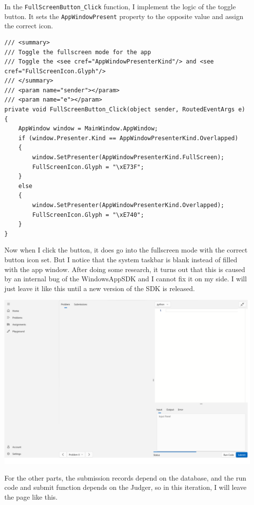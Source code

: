 \documentclass[a4paper]{report}
\begin{document}
In the \verb|FullScreenButton_Click| function, I implement the logic of the toggle button. It sets the \verb|AppWindowPresent| property\cite{microsoft:docs:windowing-overview} to the opposite value and assign the correct icon\cite{microsoft:docs:segoe-fluent-icons-font}.

\begin{verbatim}
/// <summary>
/// Toggle the fullscreen mode for the app
/// Toggle the <see cref="AppWindowPresenterKind"/> and <see cref="FullScreenIcon.Glyph"/>
/// </summary>
/// <param name="sender"></param>
/// <param name="e"></param>
private void FullScreenButton_Click(object sender, RoutedEventArgs e)
{
    AppWindow window = MainWindow.AppWindow;
    if (window.Presenter.Kind == AppWindowPresenterKind.Overlapped)
    {
        window.SetPresenter(AppWindowPresenterKind.FullScreen);
        FullScreenIcon.Glyph = "\xE73F";
    }
    else
    {
        window.SetPresenter(AppWindowPresenterKind.Overlapped);
        FullScreenIcon.Glyph = "\xE740";
    }
}
\end{verbatim}

Now when I click the button, it does go into the fullscreen mode with the correct button icon set. But I notice that the system taskbar is blank instead of filled with the app window. After doing some research, it turns out that this is caused by an internal bug of the WindowsAppSDK\cite{github:WindowsAppSDK:1853} and I cannot fix it on my side. I will just leave it like this until a new version of the SDK is released.

\includegraphics[width=\textwidth, height=\textheight, keepaspectratio]{CodingPage-FullScreen-Bug.png}

For the other parts, the submission records depend on the database, and the run code and submit function depends on the Judger, so in this iteration, I will leave the page like this.
\end{document}
